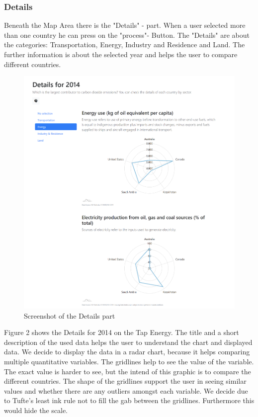 \documentclass[a4paper]{article}
\begin{document}
\subsubsection{Details}
Beneath the Map Area there is the "Details" - part. When a user selected more than one country he can press on the "process"- Button. The "Details" are about the categories: Transportation, Energy, Industry and Residence and Land. The further information is about the selected year and helps the user to compare different countries. 
\newpage

\begin{figure}[h!]
\includegraphics[width=1.0\textwidth]{detail.png} 
\caption{Screenshot of the Details part}
\end{figure}

Figure 2 shows the Details for 2014 on the Tap Energy. The title and a short description of the used data helps the user to understand the chart and displayed data. We decide to display the data in a radar chart, because it helps comparing multiple quantitative variables. The gridlines help to see the value of the variable. The exact value is harder to see, but the intend of this graphic is to compare the different countries. The shape of the gridlines support the user in seeing similar values and whether there are any outliers amongst each variable. We decide due to Tufte's least ink rule not to fill the gab between the gridlines. Furthermore this would hide the scale. 
\newpage
\end{document}
